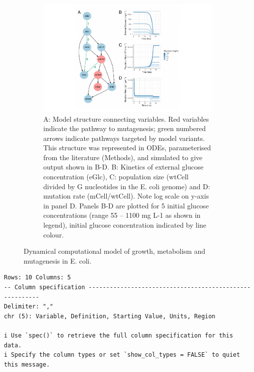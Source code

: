 \documentclass[
  12pt,
  letterpaper,
  DIV=11,
  numbers=noendperiod]{scrreprt}
\begin{document}
\begin{figure}
{\begin{figure}[H]
{\centering \includegraphics{Chap2PBio_files/figure-pdf/fig-one-1.pdf}

}

\caption{A: Model structure connecting variables. Red variables indicate
the pathway to mutagenesis; green numbered arrows indicate pathways
targeted by model variants. This structure was represented in ODEs,
parameterised from the literature (Methods), and simulated to give
output shown in B-D. B: Kinetics of external glucose concentration
(eGlc), C: population size (wtCell divided by G nucleotides in the E.
coli genome) and D: mutation rate (mCell/wtCell). Note log scale on
y-axis in panel D. Panels B-D are plotted for 5 initial glucose
concentrations (range 55 -- 1100 mg L-1 as shown in legend), initial
glucose concentration indicated by line colour.}

\end{figure}

}

\caption{\label{fig-one}Dynamical computational model of growth,
metabolism and mutagenesis in E. coli.}

\end{figure}

\begin{verbatim}
Rows: 10 Columns: 5
-- Column specification --------------------------------------------------------
Delimiter: ","
chr (5): Variable, Definition, Starting Value, Units, Region

i Use `spec()` to retrieve the full column specification for this data.
i Specify the column types or set `show_col_types = FALSE` to quiet this message.
\end{verbatim}
\end{document}
